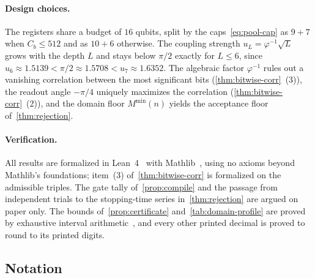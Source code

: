 \documentclass[11pt,a4paper]{article}
\theoremstyle{plain}
\theoremstyle{definition}
\theoremstyle{remark}
\begin{document}
\paragraph{Design choices.} The registers share a budget of \( 16 \) qubits, split by the
caps~\eqref{eq:pool-cap} as \( 9 + 7 \) when \( C_b \le 512 \) and as \( 10 + 6 \) otherwise.
The coupling strength \( u_L = \varphi^{-1}\sqrt{L} \) grows with the depth \( L \) and stays
below \( \pi / 2 \) exactly for \( L \le 6 \), since
\( u_6 \approx 1.5139 < \pi / 2 \approx 1.5708 < u_7 \approx 1.6352 \). The algebraic factor
\( \varphi^{-1} \) rules out a vanishing correlation between the most significant bits
(\cref{thm:bitwise-corr}~(3)), the readout angle \( -\pi / 4 \) uniquely maximizes the
correlation (\cref{thm:bitwise-corr}~(2)), and the domain floor \( M^{\min}(n) \) yields
the acceptance floor of~\cref{thm:rejection}.

\paragraph{Verification.} All results are formalized in Lean~4~\cite{deMouraUllrich2021} with
Mathlib~\cite{Mathlib2020}, using no axioms beyond Mathlib's foundations; item~(3)
of~\cref{thm:bitwise-corr} is formalized on the admissible triples. The gate tally
of~\cref{prop:compile} and the passage from independent trials to the stopping-time series
in~\cref{thm:rejection} are argued on paper only. The bounds of~\cref{prop:certificate}
and~\cref{tab:domain-profile} are proved by exhaustive interval arithmetic~\cite{Moore1966},
and every other printed decimal is proved to round to its printed digits.

\subsection{Notation}\label{sec:notation}
\end{document}
